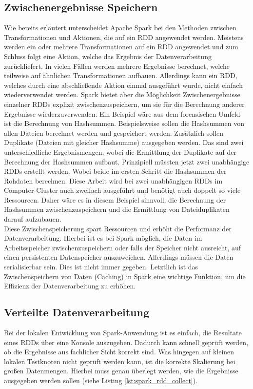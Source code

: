 \subsection*{Zwischenergebnisse Speichern}
Wie bereits erläutert unterscheidet Apache Spark bei den Methoden zwischen Transformationen und Aktionen, die auf ein RDD angewendet werden. Meistens werden ein oder mehrere Transformationen auf ein RDD angewendet und zum Schluss folgt eine Aktion, welche das Ergebnis der Datenverarbeitung zurückliefert. In vielen Fällen werden mehrere Ergebnisse berechnet, welche teilweise auf ähnlichen Transformationen aufbauen. Allerdings kann ein RDD, welches durch eine abschließende Aktion einmal ausgeführt wurde, nicht einfach wiederverwendet werden. Spark bietet aber die Möglichkeit Zwischenergebnisse einzelner RDDs explizit zwischenzuspeichern, um sie für die Berechnung anderer Ergebnisse wiederzuverwenden. Ein Beispiel wäre aus dem forensischen Umfeld ist die Berechnung von Hashsummen. Beispielsweise sollen die Hashsummen von allen Dateien berechnet werden und gespeichert werden. Zusätzlich sollen Duplikate (Dateien mit gleicher Hashsumme) ausgegeben werden. Das sind zwei unterschiedliche Ergebnismengen, wobei die Ermittlung der Duplikate auf der Berechnung der Hashsummen aufbaut. Prinzipiell müssten jetzt zwei unabhängige RDDs erstellt werden. Wobei beide im ersten Schritt die Hashsummen der Rohdaten berechnen. Diese Arbeit wird bei zwei unabhängigen RDDs im Computer-Cluster auch zweifach ausgeführt und benötigt auch doppelt so viele Ressourcen. Daher wäre es in diesem Beispiel sinnvoll, die Berechnung der Hashsummen zwischenzuspeichern und die Ermittlung von Dateiduplikaten darauf aufzubauen.\\
Diese Zwischenspeicherung spart Ressourcen und erhöht die Performanz der Datenverarbeitung. Hierbei ist es bei Spark möglich, die Daten im Arbeitsspeicher zwischenzuspeichern oder falls der Speicher nicht ausreicht, auf einen persistenten Datenspeicher auszuweichen. Allerdings müssen die Daten serialisierbar sein. Dies ist nicht immer gegeben. Letztlich ist das Zwischenspeichern von Daten (Caching) in Spark eine wichtige Funktion, um die Effizienz der Datenverarbeitung zu erhöhen.\cite{spark_rdd}

\subsection*{Verteilte Datenverarbeitung}
Bei der lokalen Entwicklung von Spark-Anwendung ist es einfach, die Resultate eines RDDs über eine Konsole auszugeben. Dadurch kann schnell geprüft werden, ob die Ergebnisse aus fachlicher Sicht korrekt sind. Was hingegen auf kleinen lokalen Testknoten nicht geprüft werden kann, ist die korrekte Skalierung bei großen Datenmengen. Hierbei muss genau überlegt werden, wie die Ergebnisse ausgegeben werden sollen (siehe Listing \ref{lst:spark_rdd_collect}). 

